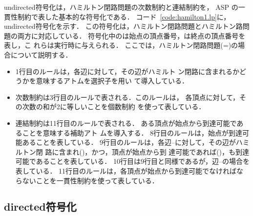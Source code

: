 

\textsf{undirected}符号化は，ハミルトン閉路問題の次数制約と連結制約を，
ASP の一貫性制約で表した基本的な符号化である．
コード~\ref{code:hamilton1.lp}に，\textsf{undirected}符号化を示す．
この符号化は，ハミルトン閉路問題とハミルトン路問題の両方に対応している．
符号化中のは始点の頂点番号，は終点の頂点番号を表し，こ
れらは実行時に与えられる．
ここでは，ハミルトン閉路問題(=)の場合について説明する．

\begin{itemize}
\item 1行目のルールは，各辺に対して，その辺がハミルト
  ン閉路に含まれるかどうかを意味するアトムを選択子を用い
  て導入している．
\item 次数制約は3行目のルールで表される．このルールは，
  各頂点に対して，その次数の和が2に等しいことを個数制約
  を使って表している．
\item 連結制約は11行目のルールで表される．
ある頂点が始点から到達可能であることを意味する補助アト
ムを導入する．
8行目のルールは，始点が到達可能あることを表している．
9行目のルールは，各辺--に対して，その辺がハミルトン閉
路に含まれ()，かつ，頂点が始点から到
達可能であれば()，も到達可能であることを表している．
10行目は9行目と同様であるが，辺--の場合を表している．
11行目のルールは，各頂点が始点から到達可能でなければな
らないことを一貫性制約を使って表している．
\end{itemize}

\subsection{\textsf{directed}符号化}



